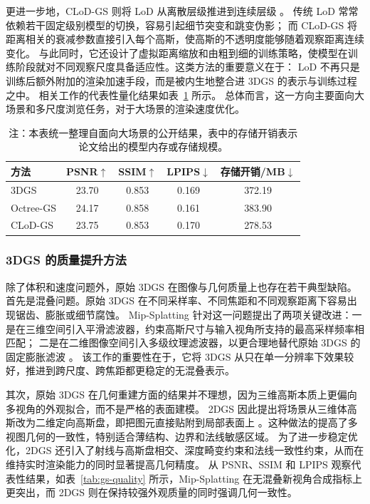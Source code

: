 更进一步地，CLoD-GS 则将 LoD 从离散层级推进到连续层级 \cite{cheng2025clodgs}。
传统 LoD 常常依赖若干固定级别模型的切换，容易引起细节突变和跳变伪影；
而 CLoD-GS 将距离相关的衰减参数直接引入每个高斯，使高斯的不透明度能够随着观察距离连续变化。
与此同时，它还设计了虚拟距离缩放和由粗到细的训练策略，使模型在训练阶段就对不同观察尺度具备适应性。这类方法的重要意义在于：
LoD 不再只是训练后额外附加的渲染加速手段，而是被内生地整合进 3DGS 的表示与训练过程之中。
相关工作的代表性量化结果如表~\ref{tab:gs-lod} 所示。
总体而言，这一方向主要面向大场景和多尺度浏览任务，对于大场景的渲染速度优化。

\begin{table}[htbp]
    \centering
    \caption{LoD 方法在 Tanks \& Temples 上的代表性结果}
    \label{tab:gs-lod}
    \small
    \begin{tabular}{lcccc}
        \toprule
        方法 & PSNR$\uparrow$ & SSIM$\uparrow$ & LPIPS$\downarrow$ & 存储开销/MB$\downarrow$ \\
        \midrule
        3DGS & 23.70 & 0.853 & 0.169 & 372.19 \\
        Octree-GS & 24.17 & 0.858 & 0.161 & 383.90 \\
        CLoD-GS & 23.75 & 0.853 & 0.170 & 278.53 \\
        \bottomrule
    \end{tabular}
    \caption*{\footnotesize 注：本表统一整理自面向大场景的公开结果，表中的存储开销表示论文给出的模型内存或存储规模。}
\end{table}

\subsubsection{3DGS 的质量提升方法}

除了体积和速度问题外，原始 3DGS 在图像与几何质量上也存在若干典型缺陷。首先是混叠问题。原始 3DGS 在不同采样率、不同焦距和不同观察距离下容易出现锯齿、膨胀或细节腐蚀。
Mip-Splatting 针对这一问题提出了两项关键改进：一是在三维空间引入平滑滤波器，约束高斯尺寸与输入视角所支持的最高采样频率相匹配；
二是在二维图像空间引入多级纹理滤波器，以更合理地替代原始 3DGS 的固定膨胀滤波 \cite{yu2024mipsplatting}。
该工作的重要性在于，它将 3DGS 从只在单一分辨率下效果较好，推进到跨尺度、跨焦距都更稳定的无混叠表示。

其次，原始 3DGS 在几何重建方面的结果并不理想，因为三维高斯本质上更偏向多视角的外观拟合，而不是严格的表面建模。
2DGS 因此提出将场景从三维体高斯改为二维定向高斯盘，即把图元直接贴附到局部表面上 \cite{huang2024twodgs}。这种做法的提高了多视图几何的一致性，特别适合薄结构、边界和法线敏感区域。
为了进一步稳定优化，2DGS 还引入了射线与高斯盘相交、深度畸变约束和法线一致性约束，从而在维持实时渲染能力的同时显著提高几何精度。
从 PSNR、SSIM 和 LPIPS 观察代表性结果，如表~\ref{tab:gs-quality} 所示，Mip-Splatting 在无混叠新视角合成指标上更突出，而 2DGS 则在保持较强外观质量的同时强调几何一致性。

